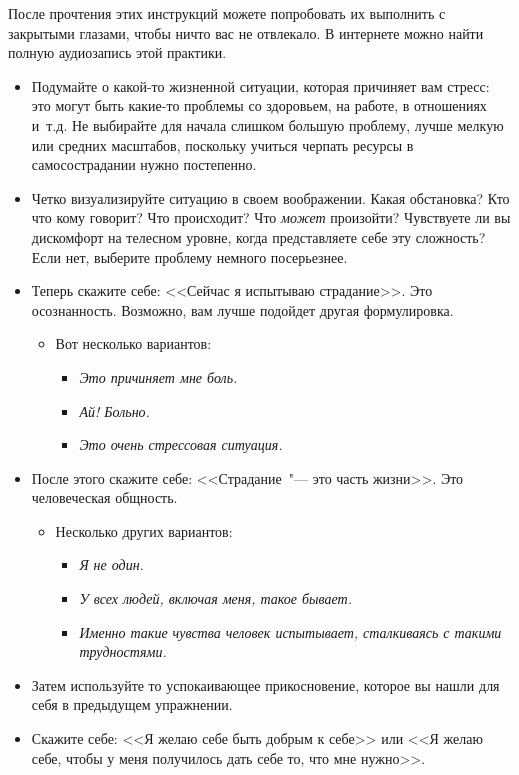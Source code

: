 После прочтения этих инструкций можете попробовать их выполнить с закрытыми глазами, чтобы ничто вас не отвлекало. В интернете можно найти полную аудиозапись этой практики.

\begin{itemize}
	\item Подумайте о какой-то жизненной ситуации, которая причиняет вам стресс: это могут быть какие-то проблемы со здоровьем, на работе, в отношениях и~т.\:д. Не выбирайте для начала слишком большую проблему, лучше мелкую или средних масштабов, поскольку учиться черпать ресурсы в самосострадании нужно постепенно.
	\item Четко визуализируйте ситуацию в своем воображении. Какая обстановка? Кто что кому говорит? Что происходит? Что \textit{может} произойти? Чувствуете ли вы дискомфорт на телесном уровне, когда представляете себе эту сложность? Если нет, выберите проблему немного посерьезнее.
	\item Теперь скажите себе: <<Сейчас я испытываю страдание>>. Это осознанность. Возможно, вам лучше подойдет другая формулировка.
	\begin{itemize}
		\item Вот несколько вариантов:
		\begin{itemize}
			\item \textit{Это причиняет мне боль.}
			\item \textit{Ай! Больно.}
			\item \textit{Это очень стрессовая ситуация.}
		\end{itemize}
	\end{itemize}
	\item После этого скажите себе: <<Страдание~"--- это часть жизни>>. Это человеческая общность.
	\begin{itemize}
		\item Несколько других вариантов:
		\begin{itemize}
			\item \textit{Я не один.}
			\item \textit{У всех людей, включая меня, такое бывает.}
			\item \textit{Именно такие чувства человек испытывает, сталкиваясь с такими трудностями.}
		\end{itemize}
	\end{itemize}
	\item Затем используйте то успокаивающее прикосновение, которое вы нашли для себя в предыдущем упражнении. 
	\item Скажите себе: <<Я желаю себе быть добрым к себе>> или <<Я желаю себе, чтобы у меня получилось дать себе то, что мне нужно>>.


\end{itemize}
